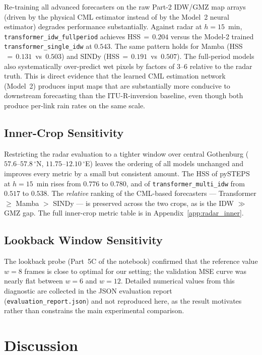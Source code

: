 \documentclass[12pt, a4paper]{article}
\begin{document}
Re-training all advanced forecasters on the raw Part-2 IDW/GMZ map
arrays (driven by the physical CML estimator instead of by the
Model~2 neural estimator) degrades performance substantially. Against
radar at $h\!=\!15$~min, \texttt{transformer\_idw\_fullperiod}
achieves HSS$\,=\,0.204$ versus the Model-2 trained
\texttt{transformer\_single\_idw} at $0.543$. The same pattern holds
for Mamba (HSS$\,=\,0.131$~vs~$0.503$) and SINDy
(HSS$\,=\,0.191$~vs~$0.507$). The full-period models also
systematically over-predict wet pixels by factors of 3--6 relative to
the radar truth. This is direct evidence that the learned CML
estimation network (Model~2) produces input maps that are
substantially more conducive to downstream forecasting than the
ITU-R-inversion baseline, even though both produce per-link rain rates
on the same scale.

\subsection{Inner-Crop Sensitivity}\label{sec:results:inner}

Restricting the radar evaluation to a tighter window over central
Gothenburg ($57.6$--$57.8$\,$^\circ$N, $11.75$--$12.10$\,$^\circ$E)
leaves the ordering of all models unchanged and improves every
metric by a small but consistent amount. The HSS of pySTEPS at
$h\!=\!15$~min rises from $0.776$ to $0.780$, and of
\texttt{transformer\_multi\_idw} from $0.517$ to $0.538$. The
\emph{relative} ranking of the CML-based forecasters --- Transformer
$\geq$ Mamba $>$ SINDy --- is preserved across the two crops, as is
the IDW $\gg$ GMZ gap. The full inner-crop metric table is in
Appendix~\ref{app:radar_inner}.

\subsection{Lookback Window Sensitivity}\label{sec:results:lookback}

The lookback probe (Part~5C of the notebook) confirmed that the
reference value $w\!=\!8$ frames is close to optimal for our setting;
the validation MSE curve was nearly flat between $w\!=\!6$ and
$w\!=\!12$. Detailed numerical values from this diagnostic are
collected in the JSON evaluation report
(\texttt{evaluation\_report.json}) and not reproduced here, as the
result motivates rather than constrains the main experimental
comparison.

\section{Discussion}\label{sec:discussion}
\end{document}
